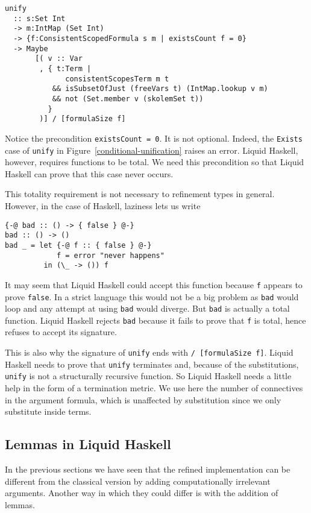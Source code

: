 \documentclass[sigconf]{acmart}
\newcommand{\tc}[1]{{\small\texttt{#1}}}
\begin{document}
\begin{verbatim}
unify
  :: s:Set Int
  -> m:IntMap (Set Int)
  -> {f:ConsistentScopedFormula s m | existsCount f = 0}
  -> Maybe
       [( v :: Var
        , { t:Term |
              consistentScopesTerm m t
           && isSubsetOfJust (freeVars t) (IntMap.lookup v m)
           && not (Set.member v (skolemSet t))
          }
        )] / [formulaSize f]
\end{verbatim}

Notice the precondition \tc{existsCount = 0}. It is not optional. Indeed, the
\tc{Exists} case of \tc{unify} in Figure~\ref{conditional-unification} raises an
error. Liquid Haskell, however, requires functions to be total. We need this
precondition so that Liquid Haskell can prove that this case never occurs.

This totality requirement is not necessary to refinement types in general.
However, in the case of Haskell, laziness lets us write
\begin{verbatim}
{-@ bad :: () -> { false } @-}
bad :: () -> ()
bad _ = let {-@ f :: { false } @-}
            f = error "never happens"
         in (\_ -> ()) f
\end{verbatim}
It may seem that Liquid Haskell could accept this function because \tc{f} appears
to prove \tc{false}. In a strict language this would not be a big problem as
\tc{bad} would loop and any attempt at using \tc{bad} would diverge. But \tc{bad} is
actually a total function. Liquid Haskell rejects \tc{bad} because it fails to
prove that \tc{f} is total, hence refuses to accept its signature.

This is also why the signature of \tc{unify} ends with \tc{/ [formulaSize f]}.
Liquid Haskell needs to prove that \tc{unify} terminates and, because of the
substitutions, \tc{unify} is not a structurally recursive function. So Liquid
Haskell needs a little help in the form of a termination metric. We use here
the number of connectives in the argument formula, which is unaffected by
substitution since we only substitute inside terms.


\subsection{Lemmas in Liquid Haskell}
\label{sec:lh-lemmas}

In the previous sections we have seen that the refined implementation can be
different from the classical version by adding computationally irrelevant
arguments. Another way in which they could differ is with the addition of lemmas.
\end{document}
